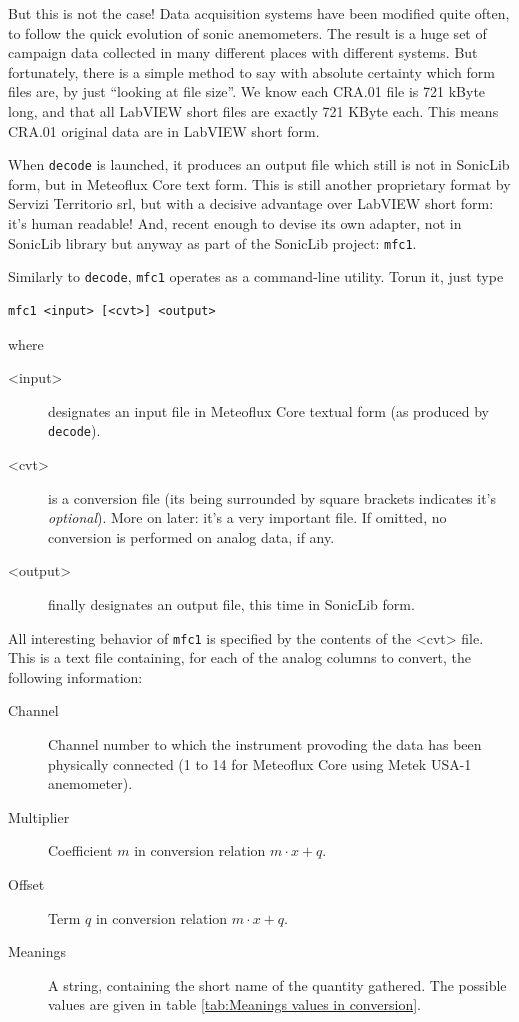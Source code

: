 \documentclass[a4paper,10pt]{book}
\begin{document}
But this is not the case! Data acquisition systems have been modified quite often, to follow the quick evolution of sonic anemometers. The result is a huge set of campaign data collected in many different places with different systems. But fortunately, there is a simple method to say with absolute certainty which form files are, by just ``looking at file size''. We know each CRA.01 file is 721 kByte long, and that all LabVIEW short files are exactly 721 KByte each. This means CRA.01 original data are in LabVIEW short form.

When \verb|decode| is launched, it produces an output file which still is not in SonicLib form, but in Meteoflux Core text form. This is still another proprietary format by Servizi Territorio srl, but with a decisive advantage over LabVIEW short form: it's human readable! And, recent enough to devise its own adapter, not in SonicLib library but anyway as part of the SonicLib project: \verb|mfc1|.

Similarly to \verb|decode|, \verb|mfc1| operates as a command-line utility. Torun it, just type

\begin{verbatim}
mfc1 <input> [<cvt>] <output>
\end{verbatim}

\noindent where

\begin{description}
 \item[<input>] designates an input file in Meteoflux Core textual form (as produced by \verb|decode|).
 \item[<cvt>] is a conversion file (its being surrounded by square brackets indicates it's \emph{optional}). More on later: it's a very important file. If omitted, no conversion is performed on analog data, if any.
 \item[<output>] finally designates an output file, this time in SonicLib form.
\end{description}

All interesting behavior of \verb|mfc1| is specified by the contents of the <cvt> file. This is a text file containing, for each of the analog columns to convert, the following information:

\begin{description}
 \item[Channel] Channel number to which the instrument provoding the data has been physically connected (1 to 14 for Meteoflux Core using Metek USA-1 anemometer).
 \item[Multiplier] Coefficient $m$ in conversion relation $m \cdot x + q$.
 \item[Offset] Term $q$ in conversion relation $m \cdot x + q$.
 \item[Meanings] A string, containing the short name of the quantity gathered. The possible values are given in table \ref{tab:Meanings values in conversion}.
\end{description}
\end{document}
